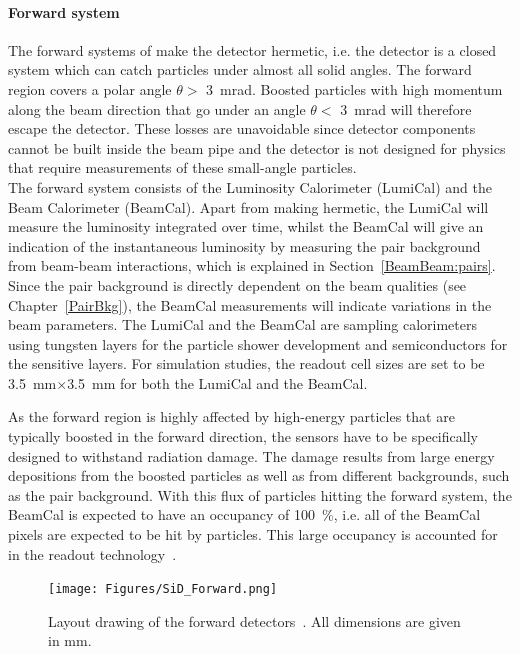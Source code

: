 \paragraph{Forward system}
The forward systems of \sid make the detector hermetic, i.e. the detector is a closed system which can catch particles under almost all solid angles.
The forward region covers a polar angle $\theta > $ \SI{3}{\milli\radian}.
Boosted particles with high momentum along the beam direction that go under an angle $\theta < $ \SI{3}{\milli\radian} will therefore escape the detector.
These losses are unavoidable since detector components cannot be built inside the beam pipe and the detector is not designed for physics that require measurements of these small-angle particles.
\\The forward system consists of the Luminosity Calorimeter (LumiCal) and the Beam Calorimeter (BeamCal).
Apart from making \sid hermetic, the LumiCal will measure the luminosity integrated over time, whilst the BeamCal will give an indication of the instantaneous luminosity by measuring the \positron \electron pair background from beam-beam interactions, which is explained in Section~\ref{BeamBeam:pairs}.
Since the pair background is directly dependent on the beam qualities (see Chapter~\ref{PairBkg}), the BeamCal measurements will indicate variations in the beam parameters.
The LumiCal and the BeamCal are sampling calorimeters using tungsten layers for the particle shower development and semiconductors for the sensitive layers.
For simulation studies, the readout cell sizes are set to be \SI{3.5}{\milli\meter}$\times$\SI{3.5}{\milli\meter} for both the LumiCal and the BeamCal.

As the forward region is highly affected by high-energy particles that are typically boosted in the forward direction, the sensors have to be specifically designed to withstand radiation damage.
The damage results from large energy depositions from the boosted particles as well as from different backgrounds, such as the pair background.
With this flux of particles hitting the forward system, the BeamCal is expected to have an occupancy of \SI{100}{\percent}, i.e. all of the BeamCal pixels are expected to be hit by particles.
This large occupancy is accounted for in the readout technology~\cite[p. 133ff]{TDR4}.
\begin{figure}[h!]
\centering
\texttt{[image: Figures/SiD\_Forward.png]}
\caption[Drawing of the \sid forward detectors]{Layout drawing of the \sid forward detectors~\cite[p. 134]{TDR4}.
All dimensions are given in mm.}
\label{fig:SiD_Forward}
\end{figure}

